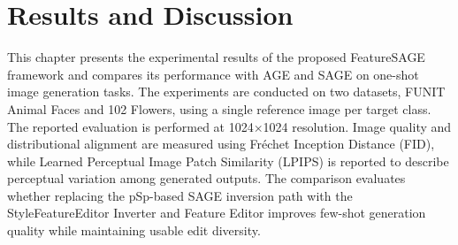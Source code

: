 \chapter[RESULTS AND DISCUSSION]{Results and Discussion}

This chapter presents the experimental results of the proposed FeatureSAGE framework and compares its performance with AGE and SAGE on one-shot image generation tasks. The experiments are conducted on two datasets, FUNIT Animal Faces and 102 Flowers, using a single reference image per target class. The reported evaluation is performed at 1024$\times$1024 resolution. Image quality and distributional alignment are measured using Fr\'echet Inception Distance (FID), while Learned Perceptual Image Patch Similarity (LPIPS) is reported to describe perceptual variation among generated outputs. The comparison evaluates whether replacing the pSp-based SAGE inversion path with the StyleFeatureEditor Inverter and Feature Editor improves few-shot generation quality while maintaining usable edit diversity.










